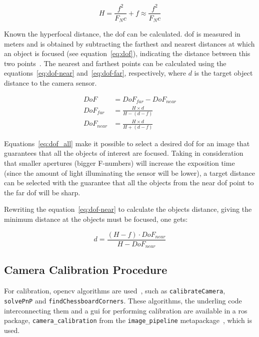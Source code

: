 \begin{equation}
	\label{eq:hyperfocal_distance}
	H = \frac{f^2}{F_Nc} + f \approx \frac{f^2}{F_Nc} 
\end{equation}

Known the hyperfocal distance, the \acf{dof} can be calculated. \ac{dof} is measured in meters and is obtained by subtracting the farthest and nearest distances at which an object is focused (see equation~\eqref{eq:dof}), indicating the distance between this two points~\cite{Photopillers, Merklinger1993, mvg_book}. The nearest and farthest points can be calculated using the equations~\eqref{eq:dof-near} and~\eqref{eq:dof-far}, respectively, where $d$ is the target object distance to the camera sensor.

\begin{subequations}
	\label{eq:dof_all}
	\begin{align}
		DoF & = DoF_{far} - DoF_{near} \label{eq:dof} \\
		DoF_{far} & = \frac{H\times d}{H - (d - f)} \label{eq:dof-far} \\
		DoF_{near} & = \frac{H\times d}{H + (d - f)} \label{eq:dof-near} 
	\end{align}
\end{subequations}

Equations~\eqref{eq:dof_all} make it possible to select a desired \acl{dof} for an image that guarantees that all the objects of interest are focused. Taking in consideration that smaller apertures (bigger F-numbers) will increase the exposition time~\cite{Merklinger1993} (since the amount of light illuminating the sensor will be lower), a target distance can be selected with the guarantee that all the objects from the near \ac{dof} point to the far \ac{dof} will be sharp.

Rewriting the equation~\eqref{eq:dof-near} to calculate the objects distance, giving the minimum distance at the objects must be focused, one gets: %

\begin{equation}
	\label{eq:dof-subject-distance}
	d = \frac{(H - f) \cdot DoF_{near}}{H - DoF_{near}}
\end{equation}


\subsection{Camera Calibration Procedure}
For calibration, \ac{opencv} algorithms are used~\cite{opencv_doc}, such as \texttt{calibrateCamera}, \texttt{solvePnP} and \texttt{findChessboardCorners}. These algorithms, the underling code interconnecting them and a \ac{gui} for performing calibration are available in a \ac{ros} package, \texttt{camera\_calibration} from the \texttt{image\_pipeline} metapackage~\cite{cameraCalibrationRos}, which is used.

